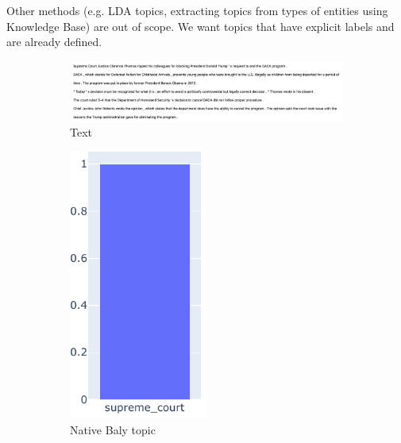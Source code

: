 Other methods (e.g. LDA topics, extracting topics from types of entities using Knowledge Base) are out of scope. We want topics that have explicit labels and are already defined.

\begin{figure}
	\centering
	\begin{subfigure}{\textwidth} %
		\includegraphics[width=\textwidth]{figures/article_topic_example.png}
		\caption{Text} %
	\end{subfigure}
	\vspace{1em} %
	\begin{subfigure}{0.3\textwidth} %
		\centering\includegraphics[width=0.5\textwidth]{figures/baly_topics.pdf}
		\caption{Native Baly topic} %
            \label{fig:topic_analysis_different_tools_baly} 
	\end{subfigure}
	\begin{subfigure}{0.3\textwidth} %

\end{subfigure}
\end{figure}
